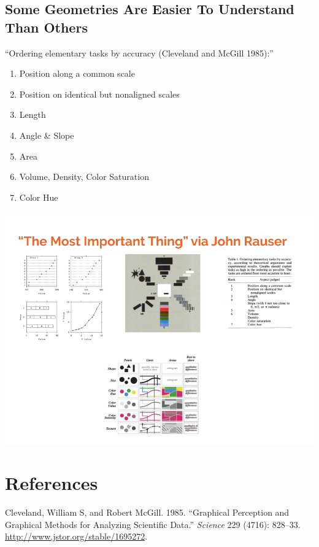 \documentclass[
]{article}
\providecommand{\tightlist}{%
  \setlength{\itemsep}{0pt}\setlength{\parskip}{0pt}}
\newlength{\cslhangindent}
\newlength{\cslentryspacingunit} %
\newenvironment{CSLReferences}[2] %
 {%
  \setlength{\parindent}{0pt}
  \ifodd #1
  \let\oldpar\par
  \def\par{\hangindent=\cslhangindent\oldpar}
  \fi
  \setlength{\parskip}{#2\cslentryspacingunit}
 }%
 {}
\begin{document}
\hypertarget{some-geometries-are-easier-to-understand-than-others}{%
\subsection{Some Geometries Are Easier To Understand Than
Others}\label{some-geometries-are-easier-to-understand-than-others}}

``Ordering elementary tasks by accuracy (Cleveland and McGill 1985):''

\begin{enumerate}
\def\labelenumi{\arabic{enumi}.}
\tightlist
\item
  Position along a common scale
\item
  Position on identical but nonaligned scales
\item
  Length
\item
  Angle \& Slope
\item
  Area
\item
  Volume, Density, Color Saturation
\item
  Color Hue
\end{enumerate}

\includegraphics{Rauser-most-important-thing.png}

\hypertarget{references}{%
\section*{References}\label{references}}

\hypertarget{refs}{}
\begin{CSLReferences}{1}{0}
\leavevmode{}%
Cleveland, William S, and Robert McGill. 1985. {``{Graphical Perception
and Graphical Methods for Analyzing Scientific Data}.''} \emph{Science}
229 (4716): 828--33. \url{http://www.jstor.org/stable/1695272}.

\end{CSLReferences}
\end{document}
